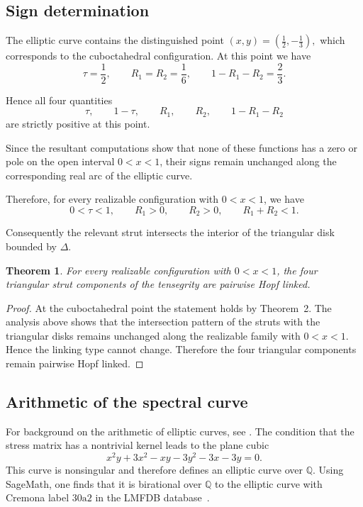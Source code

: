 \documentclass[12pt]{article}
\newtheorem{thm}{Theorem}
\begin{document}
\subsection{Sign determination}

The elliptic curve contains the distinguished point
$
(x,y)=\left(\frac12,-\frac13\right),
$
which corresponds to the cuboctahedral configuration.
At this point we have
\[
\tau=\frac12,
\qquad
R_1=R_2=\frac16,
\qquad
1-R_1-R_2=\frac23.
\]

Hence all four quantities
\[
\tau,\qquad 1-\tau,\qquad R_1,\qquad R_2,\qquad 1-R_1-R_2
\]
are strictly positive at this point.

Since the resultant computations show that none of these functions
has a zero or pole on the open interval $0<x<1$,
their signs remain unchanged along the corresponding real arc
of the elliptic curve.

Therefore, for every realizable configuration with $0<x<1$,
we have
\[
0<\tau<1,
\qquad
R_1>0,
\qquad
R_2>0,
\qquad
R_1+R_2<1.
\]

Consequently the relevant strut intersects the interior
of the triangular disk bounded by $\Delta$.

\begin{thm}
For every realizable configuration with $0<x<1$,
the four triangular strut components of the tensegrity
are pairwise Hopf linked.
\end{thm}

\begin{proof}
At the cuboctahedral point the statement holds
by Theorem~2.
The analysis above shows that the intersection pattern
of the struts with the triangular disks
remains unchanged along the realizable family with $0<x<1$.
Hence the linking type cannot change.
Therefore the four triangular components remain
pairwise Hopf linked.
\end{proof}

\subsection{Arithmetic of the spectral curve}
For background on the arithmetic of elliptic curves, see \cite{Silverman}.
The condition that the stress matrix has a nontrivial kernel leads to the plane cubic
\begin{equation}
\label{eq:spectral_cubic}
x^2y + 3x^2 - xy - 3y^2 - 3x - 3y = 0 .
\end{equation}
This curve is nonsingular and therefore defines an elliptic curve over $\mathbb{Q}$.
Using SageMath, one finds that it is birational over $\mathbb{Q}$ to the elliptic curve
with Cremona label $30\mathrm{a}2$ in the LMFDB database~\cite{LMFDB}. 
\end{document}
